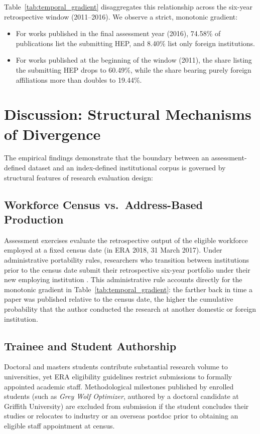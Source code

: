 \documentclass[11pt,a4paper]{article}
\begin{document}
Table~\ref{tab:temporal_gradient} disaggregates this relationship across the six-year retrospective window (2011--2016). We observe a strict, monotonic gradient:
\begin{itemize}
    \item For works published in the final assessment year (2016), 74.58\% of publications list the submitting HEP, and 8.40\% list only foreign institutions.
    \item For works published at the beginning of the window (2011), the share listing the submitting HEP drops to 60.49\%, while the share bearing purely foreign affiliations more than doubles to 19.44\%.
\end{itemize}

\section{Discussion: Structural Mechanisms of Divergence}

The empirical findings demonstrate that the boundary between an assessment-defined dataset and an index-defined institutional corpus is governed by structural features of research evaluation design:

\subsection{Workforce Census vs.\ Address-Based Production}
Assessment exercises evaluate the retrospective output of the eligible workforce employed at a fixed census date (in ERA 2018, 31 March 2017). Under administrative portability rules, researchers who transition between institutions prior to the census date submit their retrospective six-year portfolio under their new employing institution \citep{arc2018submission}. This administrative rule accounts directly for the monotonic gradient in Table~\ref{tab:temporal_gradient}: the farther back in time a paper was published relative to the census date, the higher the cumulative probability that the author conducted the research at another domestic or foreign institution.

\subsection{Trainee and Student Authorship}
Doctoral and masters students contribute substantial research volume to universities, yet ERA eligibility guidelines restrict submissions to formally appointed academic staff. Methodological milestones published by enrolled students (such as \textit{Grey Wolf Optimizer}, authored by a doctoral candidate at Griffith University) are excluded from submission if the student concludes their studies or relocates to industry or an overseas postdoc prior to obtaining an eligible staff appointment at census.
\end{document}

